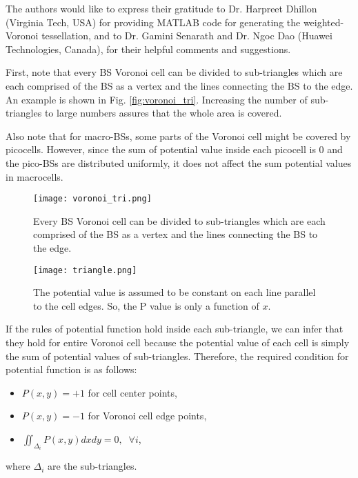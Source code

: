 \documentclass[journal]{IEEEtran}
\begin{document}
The authors would like to express their gratitude to Dr. Harpreet Dhillon (Virginia Tech, USA) for providing MATLAB code for generating the weighted-Voronoi tessellation, and to Dr. Gamini Senarath and Dr. Ngoc Dao (Huawei Technologies, Canada), for their helpful comments and suggestions.

\label{appendix1}

First, note that every BS Voronoi cell can be divided to sub-triangles which are each comprised of the BS as a vertex and the lines connecting the BS to the edge. An example is shown in Fig. \ref{fig:voronoi_tri}. Increasing the number of sub-triangles to large numbers assures that the whole area is covered.

Also note that for macro-BSs, some parts of the Voronoi cell might be covered by picocells. However, since the sum of potential value inside each picocell is 0 and the pico-BSs are distributed uniformly, it does not affect the sum potential values in macrocells.

\begin{figure}
\centering
\begin{minipage}{.45\textwidth}
  \centering
  \texttt{[image: voronoi\_tri.png]}
  \caption{Every BS Voronoi cell can be divided to sub-triangles which are each comprised of the BS as a vertex and the lines connecting the BS to the edge.}
  \label{fig:voronoi_tri}
\end{minipage}
\hspace{5 mm}
\begin{minipage}{.45\textwidth}
  \centering
  \texttt{[image: triangle.png]}
  \caption{The potential value is assumed to be constant on each line parallel to the cell edges. So, the P value is only a function of $x$.}
  \label{fig:triangle}
\end{minipage}
\end{figure}

If the rules of potential function hold inside each sub-triangle, we can infer that they hold for entire Voronoi cell because the potential value of each cell is simply the sum of potential values of sub-triangles. Therefore, the required condition for potential function is as follows:
\begin{itemize}
\item $P(x,y) = +1$ for cell center points, 
\item $P(x,y) = -1$ for Voronoi cell edge points,
\item $\iint_{\Delta_{i}}P(x,y)dxdy = 0, \;\; \forall i$,
\end{itemize}
where $\Delta_{i}$ are the sub-triangles.
\end{document}
